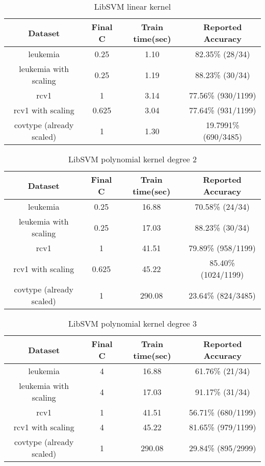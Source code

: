 \documentclass{article}
\begin{document}
\begin{table}
    \begin{tabular}{|c|c|c|c|}
    \hline
    \textbf{Dataset}                  & \textbf{Final C}  & \textbf{Train time(sec)}       & \textbf{Reported Accuracy}       \\ \hline
    leukemia                 & 0.25     & 1.10 & 82.35\% (28/34)         \\ \hline
    leukemia with scaling    & 0.25      & 1.19 & 88.23\% (30/34)         \\ \hline
    rcv1                     & 1        & 3.14 & 77.56\% (930/1199) \\ \hline
    rcv1 with scaling        & 0.625   & 3.04 & 77.64\% (931/1199) \\ \hline
    covtype (already scaled) & 1 & 1.30 & 19.7991\% (690/3485)  \\ \hline
    \end{tabular}
    \caption{LibSVM linear kernel}
\end{table}

\begin{table}
    \begin{tabular}{|c|c|c|c|}
    \hline
    \textbf{Dataset}                  & \textbf{Final C}  &\textbf{Train time(sec)}       & \textbf{Reported Accuracy}       \\ \hline
    leukemia                 & 0.25     & 16.88 & 70.58\% (24/34)         \\ \hline
    leukemia with scaling    & 0.25      & 17.03 & 88.23\% (30/34)        \\ \hline
    rcv1                     & 1        & 41.51 &  79.89\% (958/1199) \\ \hline
    rcv1 with scaling        & 0.625   & 45.22 & 85.40\% (1024/1199) \\ \hline
    covtype (already scaled) & 1 & 290.08 & 23.64\% (824/3485)  \\ \hline
    \end{tabular}
    \caption{LibSVM polynomial kernel degree 2}
\end{table}


\begin{table}
    \begin{tabular}{|c|c|c|c|}
    \hline
    \textbf{Dataset}                  & \textbf{Final C}  &\textbf{Train time(sec)}       & \textbf{Reported Accuracy}       \\ \hline
    leukemia                 & 4     & 16.88 & 61.76\% (21/34)         \\ \hline
    leukemia with scaling    & 4      & 17.03 & 91.17\% (31/34)        \\ \hline
    rcv1                     & 1        & 41.51 &  56.71\% (680/1199)\\ \hline
    rcv1 with scaling        & 4   & 45.22 & 81.65\% (979/1199) \\ \hline
    covtype (already scaled) & 1 & 290.08 & 29.84\% (895/2999)  \\ \hline
    \end{tabular}
    \caption{LibSVM polynomial kernel degree 3}
\end{table}
\end{document}
